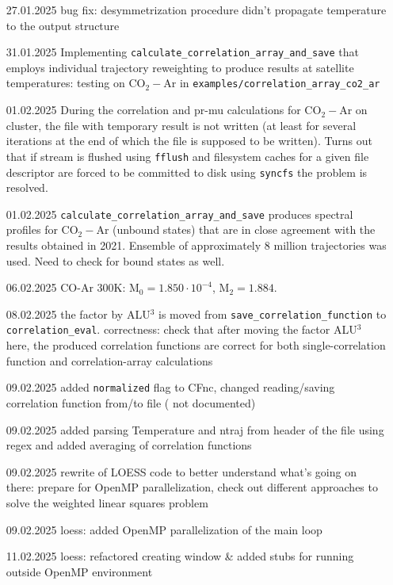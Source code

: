 \documentclass{article}
\begin{document}
\begin{enumerate}
    \item [27.01.2025] bug fix: desymmetrization procedure didn't propagate temperature to the output structure
    \item [31.01.2025] Implementing \texttt{calculate\_correlation\_array\_and\_save} that employs individual trajectory reweighting to produce results at satellite temperatures: testing on CO$_2-$Ar in \texttt{examples/correlation\_array\_co2\_ar}
    \item [01.02.2025] During the correlation and pr-mu calculations for CO$_2-$Ar on cluster, the file with temporary result is not written (at least for several iterations at the end of which the file is supposed to be written). Turns out that if stream is flushed using \texttt{fflush} and filesystem caches for a given file descriptor are forced to be committed to disk using \texttt{syncfs} the problem is resolved.
    \item [01.02.2025] \texttt{calculate\_correlation\_array\_and\_save} produces spectral profiles for CO$_2-$Ar (unbound states) that are in close agreement with the results obtained in 2021. Ensemble of approximately 8 million trajectories was used. {\color{red} Need to check for bound states as well.}
    \item [06.02.2025] CO-Ar 300K: $\text{M}_0 = 1.850 \cdot 10^{-4}$, $\text{M}_2 = 1.884$. 
    \item [08.02.2025] the factor by ALU$^3$ is moved from \texttt{save\_correlation\_function} to \texttt{correlation\_eval}. {\color{red} correctness: check that after moving the factor ALU$^3$ here, the produced correlation functions are correct for both single-correlation function and correlation-array calculations}
    \item [09.02.2025] added \texttt{normalized} flag to CFnc, changed reading/saving correlation function from/to file ({\color{red} not documented})
    \item [09.02.2025] added parsing Temperature and ntraj from header of the file using regex and added averaging of correlation functions
    \item [09.02.2025] rewrite of LOESS code to better understand what's going on there: prepare for OpenMP parallelization, check out different approaches to solve the weighted linear squares problem
    \item [09.02.2025] loess: added OpenMP parallelization of the main loop
    \item [11.02.2025] loess: refactored creating window \& added stubs for running outside OpenMP environment

\end{enumerate}
\end{document}
